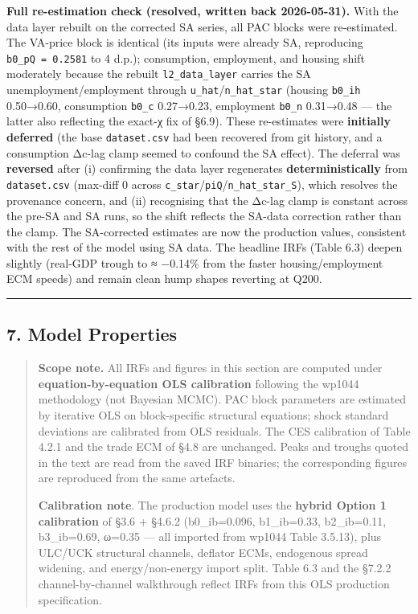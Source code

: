 \documentclass[
]{article}
\begin{document}
\textbf{Full re-estimation check (resolved, written back 2026-05-31).}
With the data layer rebuilt on the corrected SA series, all PAC blocks
were re-estimated. The VA-price block is identical (its inputs were
already SA, reproducing \texttt{b0\_pQ\ =\ 0.2581} to 4 d.p.);
consumption, employment, and housing shift moderately because the
rebuilt \texttt{l2\_data\_layer} carries the SA unemployment/employment
through \texttt{u\_hat}/\texttt{n\_hat\_star} (housing \texttt{b0\_ih}
0.50→0.60, consumption \texttt{b0\_c} 0.27→0.23, employment
\texttt{b0\_n} 0.31→0.48 --- the latter also reflecting the exact-χ fix
of §6.9). These re-estimates were \textbf{initially deferred} (the base
\texttt{dataset.csv} had been recovered from git history, and a
consumption Δc-lag clamp seemed to confound the SA effect). The deferral
was \textbf{reversed} after (i) confirming the data layer regenerates
\textbf{deterministically} from \texttt{dataset.csv} (max-diff 0 across
\texttt{c\_star}/\texttt{piQ}/\texttt{n\_hat\_star\_S}), which resolves
the provenance concern, and (ii) recognising that the Δc-lag clamp is
constant across the pre-SA and SA runs, so the shift reflects the
SA-data correction rather than the clamp. The SA-corrected estimates are
now the production values, consistent with the rest of the model using
SA data. The headline IRFs (Table 6.3) deepen slightly (real-GDP trough
to ≈ −0.14\% from the faster housing/employment ECM speeds) and remain
clean hump shapes reverting at Q200.

\begin{center}\rule{0.5\linewidth}{0.5pt}\end{center}

\subsection{7. Model Properties}\label{model-properties}

\begin{quote}
\textbf{Scope note.} All IRFs and figures in this section are computed
under \textbf{equation-by-equation OLS calibration} following the wp1044
methodology (not Bayesian MCMC). PAC block parameters are estimated by
iterative OLS on block-specific structural equations; shock standard
deviations are calibrated from OLS residuals. The CES calibration of
Table 4.2.1 and the trade ECM of §4.8 are unchanged. Peaks and troughs
quoted in the text are read from the saved IRF binaries; the
corresponding figures are reproduced from the same artefacts.

\textbf{Calibration note}. The production model uses the \textbf{hybrid
Option 1 calibration} of §3.6 + §4.6.2 (b0\_ib=0.096, b1\_ib=0.33,
b2\_ib=0.11, b3\_ib=0.69, ω=0.35 --- all imported from wp1044 Table
3.5.13), plus ULC/UCK structural channels, deflator ECMs, endogenous
spread widening, and energy/non-energy import split. Table 6.3 and the
§7.2.2 channel-by-channel walkthrough reflect IRFs from this OLS
production specification.
\end{quote}
\end{document}
